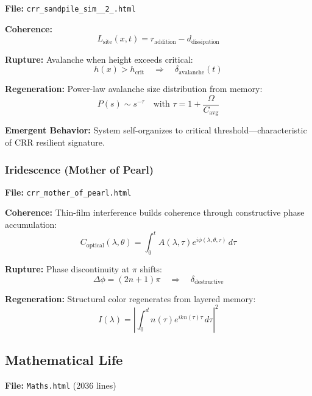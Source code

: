 \documentclass[11pt,a4paper]{article}
\theoremstyle{definition}
\theoremstyle{remark}
\begin{document}
\textbf{File:} \texttt{crr\_sandpile\_sim\_\_2\_.html}

\textbf{Coherence:}
\begin{equation}
L_{\text{site}}(x,t) = r_{\text{addition}} - d_{\text{dissipation}}
\end{equation}

\textbf{Rupture:} Avalanche when height exceeds critical:
\begin{equation}
h(x) > h_{\text{crit}} \quad \Rightarrow \quad \delta_{\text{avalanche}}(t)
\end{equation}

\textbf{Regeneration:} Power-law avalanche size distribution from memory:
\begin{equation}
P(s) \sim s^{-\tau} \quad \text{with } \tau = 1 + \frac{\Omega}{C_{\text{avg}}}
\end{equation}

\textbf{Emergent Behavior:} System self-organizes to critical threshold—characteristic of CRR resilient signature.

\subsubsection{Iridescence (Mother of Pearl)}

\textbf{File:} \texttt{crr\_mother\_of\_pearl.html}

\textbf{Coherence:} Thin-film interference builds coherence through constructive phase accumulation:
\begin{equation}
C_{\text{optical}}(\lambda,\theta) = \int_0^t A(\lambda,\tau) e^{i\phi(\lambda,\theta,\tau)}\,d\tau
\end{equation}

\textbf{Rupture:} Phase discontinuity at $\pi$ shifts:
\begin{equation}
\Delta \phi = (2n+1)\pi \quad \Rightarrow \quad \delta_{\text{destructive}}
\end{equation}

\textbf{Regeneration:} Structural color regenerates from layered memory:
\begin{equation}
I(\lambda) = \left|\int_0^d n(\tau) e^{i k n(\tau) \tau}\,d\tau\right|^2
\end{equation}

\subsection{Mathematical Life}

\textbf{File:} \texttt{Maths.html} (2036 lines)
\end{document}
